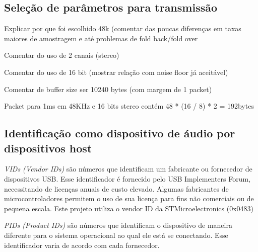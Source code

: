 \subsection{Seleção de parâmetros para transmissão}
\color{orange}
Explicar por que foi escolhido 48k (comentar das poucas diferenças em taxas maiores de amostragem e até problemas de fold back/fold over


Comentar do uso de 2 canais (stereo)

Comentar do uso de 16 bit (mostrar relação com noise floor já aceitável)

Comentar de buffer size ser 10240 bytes (com margem de 1 packet)





Packet para 1ms em 48KHz e 16 bits stereo contém 48 * (16 / 8) * 2 = 192bytes
\color{black}


\subsection{Identificação como dispositivo de áudio por dispositivos host}

\textit{VIDs (Vendor IDs)} são números que identificam um fabricante ou fornecedor de dispositivos USB. Esse identificador é fornecido pelo USB Implementers Forum, necessitando de licenças anuais de custo elevado. Algumas fabricantes de microcontroladores permitem o uso de sua licença para fins não comerciais ou de pequena escala. Este projeto utiliza o vendor ID da STMicroelectronics (0x0483)

\textit{PIDs (Product IDs)} são números que identificam o dispositivo de maneira diferente para o sistema operacional ao qual ele está se conectando. Esse identificador varia de acordo com cada fornecedor.

